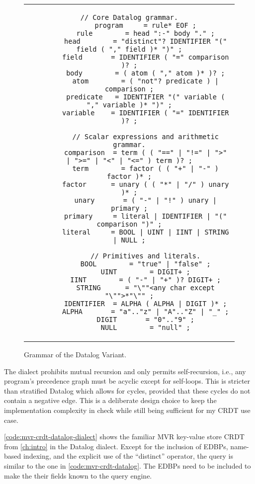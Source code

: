 \begin{figure}[htpb]
	\centering
	\begin{tabular}{c}
		\begin{lstlisting}[keepspaces]
		// Core Datalog grammar.
		program     = rule* EOF ;
        rule        = head ":-" body "." ;
        head        = "distinct"? IDENTIFIER "(" field ( "," field )* ")" ;
        field       = IDENTIFIER ( "=" comparison )? ;
        body        = ( atom ( "," atom )* )? ;
        atom        = ( "not"? predicate ) | comparison ;
        predicate   = IDENTIFIER "(" variable ( "," variable )* ")" ;
        variable    = IDENTIFIER ( "=" IDENTIFIER )? ;

        // Scalar expressions and arithmetic grammar.
		comparison  = term ( ( "==" | "!=" | ">" | ">=" | "<" | "<=" ) term )? ;
		term        = factor ( ( "+" | "-" ) factor )* ;
		factor      = unary ( ( "*" | "/" ) unary )* ;
		unary       = ( "-" | "!" ) unary | primary ;
		primary     = literal | IDENTIFIER | "(" comparison ")" ;
		literal     = BOOL | UINT | IINT | STRING | NULL ;

		// Primitives and literals.
		BOOL        = "true" | "false" ;
		UINT        = DIGIT+ ;
		IINT        = ( "-" | "+" )? DIGIT+ ;
		STRING      = "\""<any char except "\"">*"\"" ;
		IDENTIFIER  = ALPHA ( ALPHA | DIGIT )* ;
		ALPHA       = "a".."z" | "A".."Z" | "_" ;
		DIGIT       = "0".."9" ;
		NULL        = "null" ;
        \end{lstlisting}
	\end{tabular}
	\caption{Grammar of the Datalog Variant.}\label{code:datalog-grammar}
\end{figure}

The dialect prohibits mutual recursion and only permits self-recursion, i.e.,
any program's precedence graph must be acyclic except for self-loops.
This is stricter than stratified Datalog which allows for cycles,
provided that these cycles do not contain a negative edge.
This is a deliberate design choice to keep the implementation complexity in check
while still being sufficient for my \ac{CRDT} use case.

\ref{code:mvr-crdt-datalog-dialect} shows the familiar \ac{MVR} key-value store
\ac{CRDT} from \ref{ch:intro} in the Datalog dialect.
Except for the inclusion of \acp{EDBP}, name-based indexing, and the explicit
use of the ``distinct'' operator, the query is similar to the one
in \ref{code:mvr-crdt-datalog}.
The \acp{EDBP} need to be included to make the their fields known to the
query engine.


